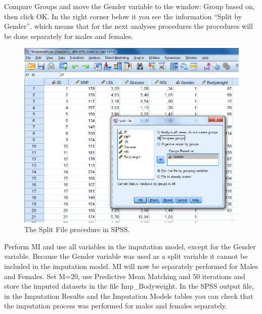\documentclass[]{book}
\theoremstyle{definition}
\theoremstyle{definition}
\theoremstyle{definition}
\theoremstyle{remark}
\begin{document}
Compare Groups and move the Gender variable to the window: Group based
on, then click OK. In the right corner below it you see the information
``Split by Gender'', which means that for the next analyses procedures
the procedures will be done separately for males and females.

\begin{figure}

{\centering \includegraphics[width=0.9\linewidth]{images/fig6.2} 

}

\caption{The Split File procedure in SPSS.}\label{fig:fig6-2}
\end{figure}

Perform MI and use all variables in the imputation model, except for the
Gender variable. Because the Gender variable was used as a split
variable it cannot be included in the imputation model. MI will now be
separately performed for Males and Females. Set M=20, use Predictive
Mean Matching and 50 iterations and store the imputed datasets in the
file Imp\_Bodyweight. In the SPSS output file, in the Imputation Results
and the Imputation Models tables you can check that the imputation
process was performed for males and females separately.
\end{document}
